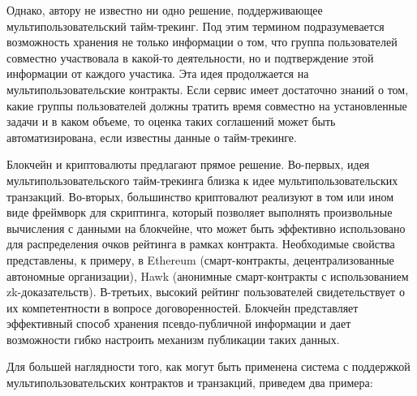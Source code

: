 \documentclass[specification,annotation]{itmo-student-thesis}
\begin{document}
Однако, автору не известно ни одно решение, поддерживающее
мультипользовательский тайм-трекинг. Под этим термином подразумевается
возможность хранения не только информации о том, что группа
пользователей совместно участвовала в какой-то деятельности, но и
подтверждение этой информации от каждого участика. Эта идея
продолжается на мультипользовательские контракты. Если сервис имеет
достаточно знаний о том, какие группы пользователей должны тратить
время совместно на установленные задачи и в каком объеме, то оценка
таких соглашений может быть автоматизирована, если известны данные о
тайм-трекинге.

Блокчейн и криптовалюты предлагают прямое решение. Во-первых, идея
мультипользовательского тайм-трекинга близка к идее
мультипользовательских транзакций. Во-вторых, большинство криптовалют
реализуют в том или ином виде фреймворк для скриптинга, который
позволяет выполнять произвольные вычисления с данными на блокчейне,
что может быть эффективно использовано для распределения очков
рейтинга в рамках контракта. Необходимые свойства представлены, к
примеру, в Ethereum \cite{ethereum} (смарт-контракты,
децентрализованные автономные организации), Hawk \cite{kosba2016hawk}
(анонимные смарт-контракты с использованием
zk-доказательств). В-третьих, высокий рейтинг пользователей
свидетельствует о их компетентности в вопросе
договоренностей. Блокчейн представляет эффективный способ хранения
псевдо-публичной информации и дает возможности гибко настроить
механизм публикации таких данных.

Для большей наглядности того, как могут быть применена система с
поддержкой мультипользовательских контрактов и транзакций, приведем
два примера:
\end{document}
